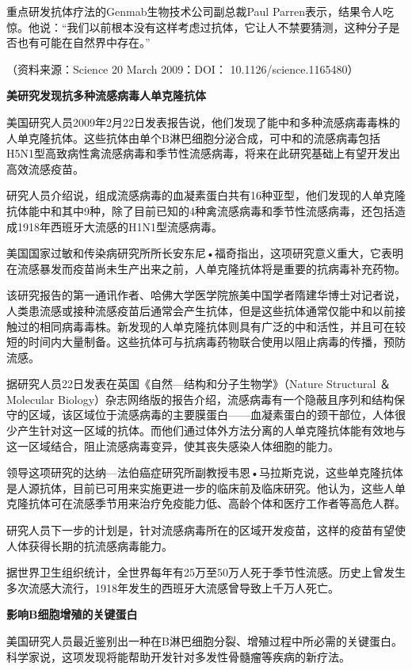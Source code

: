 重点研发抗体疗法的Genmab生物技术公司副总裁Paul
Parren表示，结果令人吃惊。他说：“我们以前根本没有这样考虑过抗体，它让人不禁要猜测，这种分子是否也有可能在自然界中存在。”

（资料来源：Science 20 March 2009：DOI： 10.1126/science.1165480）

\begin{center}
  \textbf{\Large 美研究发现抗多种流感病毒人单克隆抗体}
\end{center}
美国研究人员2009年2月22日发表报告说，他们发现了能中和多种流感病毒毒株的人单克隆抗体。这些抗体由单个B淋巴细胞分泌合成，可中和的流感病毒包括H5N1型高致病性禽流感病毒和季节性流感病毒，将来在此研究基础上有望开发出高效流感疫苗。

研究人员介绍说，组成流感病毒的血凝素蛋白共有16种亚型，他们发现的人单克隆抗体能中和其中9种，除了目前已知的4种禽流感病毒和季节性流感病毒，还包括造成1918年西班牙大流感的H1N1型流感病毒。

美国国家过敏和传染病研究所所长安东尼•福奇指出，这项研究意义重大，它表明在流感暴发而疫苗尚未生产出来之前，人单克隆抗体将是重要的抗病毒补充药物。

该研究报告的第一通讯作者、哈佛大学医学院旅美中国学者隋建华博士对记者说，人类患流感或接种流感疫苗后通常会产生抗体，但是这些抗体通常仅能中和以前接触过的相同病毒毒株。新发现的人单克隆抗体则具有广泛的中和活性，并且可在较短的时间内大量制备。这些抗体可与抗病毒药物联合使用以阻止病毒的传播，预防流感。

据研究人员22日发表在英国《自然---结构和分子生物学》（Nature Structural
＆ Molecular
Biology）杂志网络版的报告介绍，流感病毒有一个隐蔽且序列和结构保守的区域，该区域位于流感病毒的主要膜蛋白------血凝素蛋白的颈干部位，人体很少产生针对这一区域的抗体。而他们通过体外方法分离的人单克隆抗体能有效地与这一区域结合，阻止流感病毒变异，使其丧失感染人体细胞的能力。

领导这项研究的达纳---法伯癌症研究所副教授韦恩•马拉斯克说，这些单克隆抗体是人源抗体，目前已可用来实施更进一步的临床前及临床研究。他认为，这些人单克隆抗体可在流感季节用来治疗免疫能力低、高龄个体和医疗工作者等高危人群。

研究人员下一步的计划是，针对流感病毒所在的区域开发疫苗，这样的疫苗有望使人体获得长期的抗流感病毒能力。

据世界卫生组织统计，全世界每年有25万至50万人死于季节性流感。历史上曾发生多次流感大流行，1918年发生的西班牙大流感曾导致上千万人死亡。

\begin{center}
  \textbf{\Large 影响B细胞增殖的关键蛋白}
\end{center}
美国研究人员最近鉴别出一种在B淋巴细胞分裂、增殖过程中所必需的关键蛋白。科学家说，这项发现将能帮助开发针对多发性骨髓瘤等疾病的新疗法。

